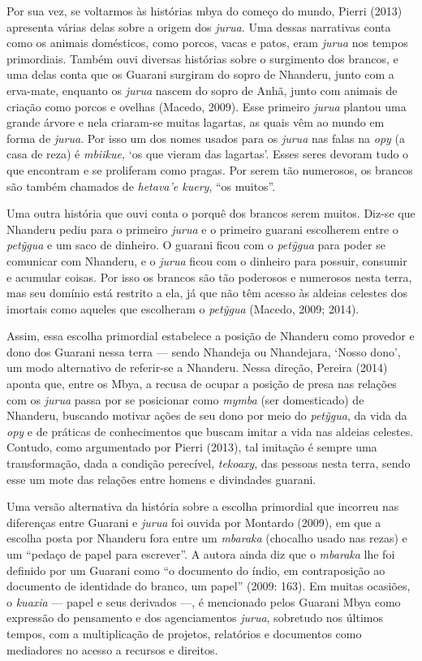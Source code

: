 Por sua vez, se voltarmos às histórias mbya do começo do mundo, Pierri
(2013) apresenta várias delas sobre a origem dos \emph{jurua.} Uma
dessas narrativas conta como os animais domésticos, como porcos, vacas e
patos, eram \emph{jurua} nos tempos primordiais. Também ouvi diversas
histórias sobre o surgimento dos brancos, e uma delas conta que os
Guarani surgiram do sopro de Nhanderu, junto com a erva-mate, enquanto
os \emph{jurua} nascem do sopro de Anhã, junto com animais de criação
como porcos e ovelhas (Macedo, 2009). Esse primeiro \emph{jurua} plantou
uma grande árvore e nela criaram-se muitas lagartas, as quais vêm ao
mundo em forma de \emph{jurua}. Por isso um dos nomes usados para os
\emph{jurua} nas falas na \emph{opy} (a casa de reza) é \emph{mbiikue,}
`os que vieram das lagartas'. Esses seres devoram tudo o que encontram e
se proliferam como pragas. Por serem tão numerosos, os brancos são
também chamados de \emph{hetava'e kuery}, ``os muitos''.

Uma outra história que ouvi conta o porquê dos brancos serem muitos.
Diz-se que Nhanderu pediu para o primeiro \emph{jurua} e o primeiro
guarani escolherem entre o \emph{petỹgua} e um saco de dinheiro. O
guarani ficou com o \emph{petỹgua} para poder se comunicar com Nhanderu,
e o \emph{jurua} ficou com o dinheiro para possuir, consumir e acumular
coisas. Por isso os brancos são tão poderosos e numerosos nesta terra,
mas seu domínio está restrito a ela, já que não têm acesso às aldeias
celestes dos imortais como aqueles que escolheram o \emph{petỹgua}
(Macedo, 2009; 2014).

Assim, essa escolha primordial estabelece a posição de Nhanderu como
provedor e dono dos Guarani nessa terra --- sendo Nhandeja ou
Nhandejara, `Nosso dono', um modo alternativo de referir-se a Nhanderu.
Nessa direção, Pereira (2014) aponta que, entre os Mbya, a recusa de
ocupar a posição de presa nas relações com os \emph{jurua} passa por se
posicionar como \emph{mymba} (ser domesticado) de Nhanderu, buscando
motivar ações de seu dono por meio do \emph{petỹgua}, da vida da
\emph{opy} e de práticas de conhecimentos que buscam imitar a vida nas
aldeias celestes. Contudo, como argumentado por Pierri (2013), tal
imitação é sempre uma transformação, dada a condição perecível,
\emph{tekoaxy}, das pessoas nesta terra, sendo esse um mote das relações
entre homens e divindades guarani.

Uma versão alternativa da história sobre a escolha primordial que
incorreu nas diferenças entre Guarani e \emph{jurua} foi ouvida por
Montardo (2009), em que a escolha posta por Nhanderu fora entre um
\emph{mbaraka} (chocalho usado nas rezas) e um ``pedaço de papel para
escrever''. A autora ainda diz que o \emph{mbaraka} lhe foi definido por
um Guarani como ``o documento do índio, em contraposição ao documento de
identidade do branco, um papel'' (2009: 163). Em muitas ocasiões, o
\emph{kuaxia} --- papel e seus derivados ---, é mencionado pelos Guarani
Mbya como expressão do pensamento e dos agenciamentos \emph{jurua},
sobretudo nos últimos tempos, com a multiplicação de projetos,
relatórios e documentos como mediadores no acesso a recursos e direitos.

